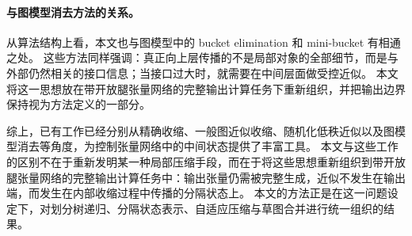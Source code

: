 \paragraph{与图模型消去方法的关系。}
从算法结构上看，本文也与图模型中的 bucket elimination 和 mini-bucket 有相通之处\cite{dechter1996bucket,dechter1997mini}。
这些方法同样强调：真正向上层传播的不是局部对象的全部细节，而是与外部仍然相关的接口信息；当接口过大时，就需要在中间层面做受控近似。
本文将这一思想放在带开放腿张量网络的完整输出计算任务下重新组织，并把输出边界保持视为方法定义的一部分。

综上，已有工作已经分别从精确收缩、一般图近似收缩、随机化低秩近似以及图模型消去等角度，为控制张量网络中的中间状态提供了丰富工具。
本文与这些工作的区别不在于重新发明某一种局部压缩手段，而在于将这些思想重新组织到带开放腿张量网络的完整输出计算任务中：输出张量仍需被完整生成，近似不发生在输出端，而发生在内部收缩过程中传播的分隔状态上。
本文的方法正是在这一问题设定下，对划分树递归、分隔状态表示、自适应压缩与草图合并进行统一组织的结果。
